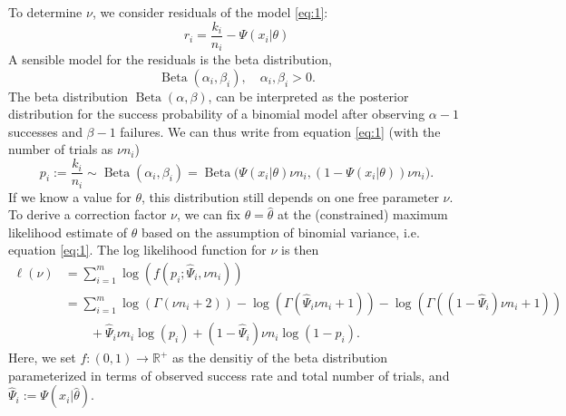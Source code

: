 \documentclass[a4paper,11pt]{scrartcl}
\def\Beta{\operatorname{Beta}}
\begin{document}
To determine $\nu$, we consider residuals of the model \eqref{eq:1}:
%
$$
r_i = \frac{k_i}{n_i} - \Psi ( x_i | \theta )
$$
%
A sensible model for the residuals is the beta distribution,
%
$$
\Beta ( \alpha_i, \beta_i ),\quad\alpha_i,\beta_i>0.
$$
%
The beta distribution $\Beta (\alpha,\beta)$, can be interpreted as the posterior distribution for the success probability of a binomial model
after observing $\alpha-1$ successes and $\beta-1$ failures.
We can thus write from equation \eqref{eq:1} (with the number of trials as $\nu n_i$)
%
\begin{equation}
    p_i := \frac{k_i}{n_i} \sim \Beta ( \alpha_i, \beta_i ) = \Beta \big( \Psi(x_i|\theta)\nu n_i, (1-\Psi(x_i|\theta))\nu n_i\big).
    \label{eq:2}
\end{equation}
%
If we know a value for $\theta$, this distribution still depends on one free parameter $\nu$.
To derive a correction factor $\nu$, we can fix $\theta=\hat{\theta}$ at the (constrained) maximum likelihood estimate of $\theta$ based
on the assumption of binomial variance, i.e. equation \eqref{eq:1}.
The log likelihood function for $\nu$ is then
%
\begin{equation}
    \begin{split}
\ell (\nu) &= \sum_{i=1}^m \log ( f ( p_i; \hat{\Psi}_i, \nu n_i) ) \\
&= \sum_{i=1}^m \log ( \Gamma ( \nu n_i+2)) - \log ( \Gamma ( \hat{\Psi}_i \nu n_i +1 ) ) - \log ( \Gamma ( (1-\hat{\Psi}_i) \nu n_i + 1 )) \\
&\qquad + \hat{\Psi}_i \nu n_i \log (p_i) + (1-\hat{\Psi}_i) \nu n_i \log ( 1-p_i).
\end{split}
\label{eq:3}
\end{equation}
%
Here, we set $f: (0,1) \to \mathbb{R}^+$ as the densitiy of the beta distribution parameterized in terms of observed success rate and total number of trials,
and $\hat{\Psi}_i := \Psi ( x_i | \hat{\theta} )$.
\end{document}
